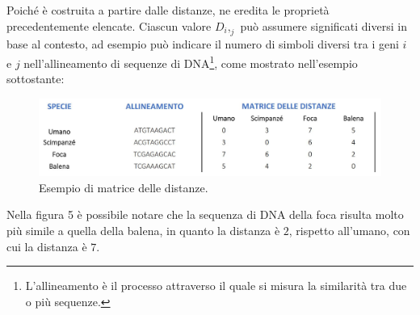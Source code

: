 Poiché è costruita a partire dalle distanze, ne eredita le proprietà precedentemente elencate.
\newline
Ciascun valore $D_i,_j$ può assumere significati diversi in base al contesto, ad esempio può indicare il numero di simboli diversi tra i geni $i$ e $j$ nell'allineamento di sequenze di DNA\footnote{L'allineamento è il processo attraverso il quale si misura la similarità tra due o più sequenze.}, come mostrato nell'esempio sottostante:
\begin{figure}[h!]
	\includegraphics[width=\linewidth]{distance_matrix_example.jpg}
 	\caption{Esempio di matrice delle distanze.}
  	\label{fig:DistanceMatrix}
\end{figure}
\newline
Nella figura 5 è possibile notare che la sequenza di DNA della foca risulta molto più simile a quella della balena, in quanto la distanza è $2$, rispetto all'umano, con cui la distanza è $7$.
\newpage

